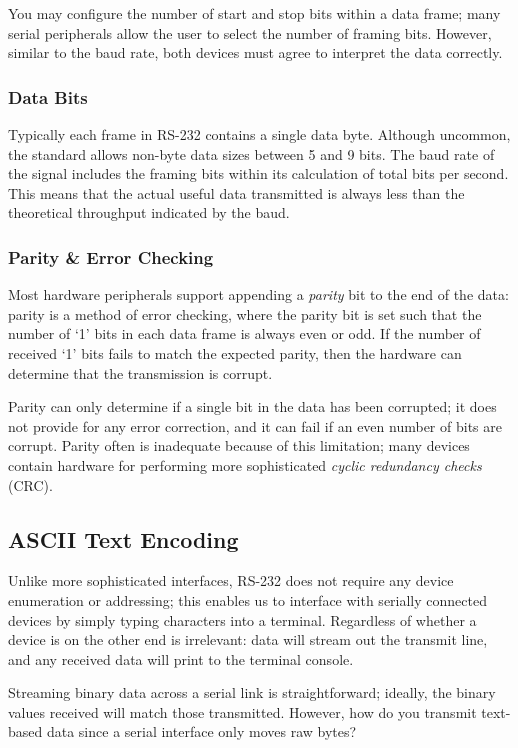 \documentclass[openany,11pt,fleqn]{book} %
\begin{document}
You may configure the number of start and stop bits within a data frame; many serial peripherals allow the user to select the number of framing bits. However, similar to the baud rate, both devices must agree to interpret the data correctly. 
 

\subsubsection{Data Bits} 
Typically each frame in RS-232 contains a single data byte. Although uncommon, the standard allows non-byte data sizes between 5 and 9 bits. The baud rate of the signal includes the framing bits within its calculation of total bits per second. This means that the actual useful data transmitted is always less than the theoretical throughput indicated by the baud. 

\subsubsection{Parity \& Error Checking}
Most hardware peripherals support appending a \textit{parity} bit to the end of the data: parity is a method of error checking, where the parity bit is set such that the number of `1' bits in each data frame is always even or odd. If the number of received `1' bits fails to match the expected parity, then the hardware can determine that the transmission is corrupt. 

Parity can only determine if a single bit in the data has been corrupted; it does not provide for any error correction, and it can fail if an even number of bits are corrupt. Parity often is inadequate because of this limitation; many devices contain hardware for performing more sophisticated \textit{cyclic redundancy checks} (CRC).  


\subsection{ASCII Text Encoding}

Unlike more sophisticated interfaces, RS-232 does not require any device enumeration or addressing; this enables us to interface with serially connected devices by simply typing characters into a terminal. Regardless of whether a device is on the other end is irrelevant: data will stream out the transmit line, and any received data will print to the terminal console.  

Streaming binary data across a serial link is straightforward; ideally, the binary values received will match those transmitted. However, how do you transmit text-based data since a serial interface only moves raw bytes?
\end{document}
